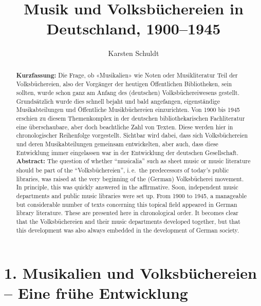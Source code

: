\documentclass[a4paper,
fontsize=11pt,
oneside,
numbers=noperiodatend,
parskip=half-,
bibliography=totoc,
final
]{scrartcl}
\title{\LARGE{Musik und Volksbüchereien in Deutschland, 1900–1945}}%
\author{Karsten Schuldt} %
\date{}
\begin{document}
\maketitle
\thispagestyle{fancyplain} 

\begin{abstract}
\noindent
\textbf{Kurzfassung:} Die Frage, ob «Musikalien» wie Noten oder
Musikliteratur Teil der Volksbüchereien, also der Vorgänger der heutigen
Öffentlichen Bibliotheken, sein sollten, wurde schon ganz am Anfang des
(deutschen) Volksbüchereiwesens gestellt. Grundsätzlich wurde dies
schnell bejaht und bald angefangen, eigenständige Musikabteilungen und
Öffentliche Musikbüchereien einzurichten. Von 1900 bis 1945 erschien zu
diesem Themenkomplex in der deutschen bibliothekarischen Fachliteratur
eine überschaubare, aber doch beachtliche Zahl von Texten. Diese werden
hier in chronologischer Reihenfolge vorgestellt. Sichtbar wird dabei,
dass sich Volksbüchereien und deren Musikabteilungen gemeinsam
entwickelten, aber auch, dass diese Entwicklung immer eingelassen war in
der Entwicklung der deutschen Gesellschaft. \\

\noindent
\textbf{Abstract:} The question of whether ``musicalia'' such as sheet
music or music literature should be part of the ``Volksbüchereien'',
i.\,e.~the predecessors of today's public libraries, was raised at the
very beginning of the (German) Volksbücherei movement. In principle,
this was quickly answered in the affirmative. Soon, independent music
departments and public music libraries were set up. From 1900 to 1945, a
manageable but considerable number of texts concerning this topical
field appeared in German library literature. These are presented here in
chronological order. It becomes clear that the Volksbüchereien and their
music departments developed together, but that this development was also
always embedded in the development of German society.
\end{abstract}

\hypertarget{musikalien-und-volksbuxfcchereien-eine-fruxfche-entwicklung}{%
\section{1. Musikalien und Volksbüchereien -- Eine frühe
Entwicklung}\label{musikalien-und-volksbuxfcchereien-eine-fruxfche-entwicklung}}
\end{document}
